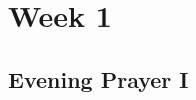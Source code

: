 \documentclass{book}
\begin{document}
\chapter{Week 1}

\section{Evening Prayer I}


\end{document}
